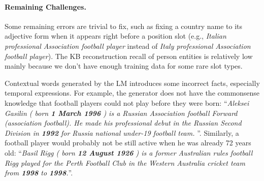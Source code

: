 \documentclass[11pt,a4paper]{article}
\begin{document}
 \paragraph{Remaining Challenges.} Some remaining errors are trivial to fix, such as fixing a country name to its adjective form when it appears right before a position slot (e.g.,  \textit{Italian professional Association football player} instead of  \textit{Italy professional Association football player}). The KB reconstruction recall of person entities is relatively low mainly because we don't have enough training data for some rare slot types. 

Contextual words generated by the LM introduces some incorrect facts, especially temporal expressions. For example, the generator does not have the commonsense knowledge that football players could not play before they were born: ``\emph{Aleksei Gasilin ( born \textbf{1 March 1996} ) is a Russian Association football Forward (association football). He made his professional debut in the Russian Second Division in \textbf{1992} for Russia national under-19 football team. }''. Similarly, a football player would probably not be still active when he was already 72 years old: ``\emph{Basil Rigg ( born \textbf{12 August 1926} ) is a former Australian rules football Rigg played for the Perth Football Club in the Western Australia cricket team from \textbf{1998} to \textbf{1998}.}''.
\end{document}
